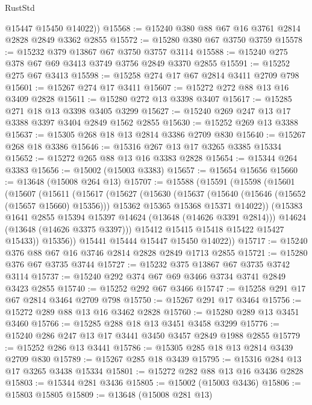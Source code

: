 \begin{lexlean}{RustStd}
\begin{coremodule}
        @15447
        @15450
        @14022))
@15568 := @15240 @380 @88 @67 @16 @3761 @2814 @2828 @2849 @3362 @2855
@15572 := @15280 @380 @67 @3750 @3759
@15578 := @15232 @379 @13867 @67 @3750 @3757 @3114
@15588 := @15240 @275 @378 @67 @69 @3413 @3749 @3756 @2849 @3370 @2855
@15591 := @15252 @275 @67 @3413
@15598 := @15258 @274 @17 @67 @2814 @3411 @2709 @798
@15601 := @15267 @274 @17 @3411
@15607 := @15272 @272 @88 @13 @16 @3409 @2828
@15611 := @15280 @272 @13 @3398 @3407
@15617 := @15285 @271 @18 @13 @3398 @3405 @3299
@15627 := @15240 @269 @247 @13 @17 @3388 @3397 @3404 @2849 @1562 @2855
@15630 := @15252 @269 @13 @3388
@15637 := @15305 @268 @18 @13 @2814 @3386 @2709 @830
@15640 := @15267 @268 @18 @3386
@15646 := @15316 @267 @13 @17 @3265 @3385 @15334
@15652 := @15272 @265 @88 @13 @16 @3383 @2828
@15654 := @15344 @264 @3383
@15656 := @15002 (@15003 @3383)
@15657 := @15654 @15656
@15660 := @13648 (@15008 @264 @13)
@15707 := @15588
    (@15591
      (@15598
        (@15601
          (@15607
            (@15611
              (@15617
                (@15627
                  (@15630
                    (@15637
                      (@15640 (@15646 (@15652 (@15657 @15660) @15356)))
                      @15362
                      @15365
                      @15368
                      @15371
                      @14022))
                  (@15383 @1641 @2855 @15394 @15397 @14624 (@13648 (@14626 @3391 @2814)))
                  @14624
                  (@13648 (@14626 @3375 @3397)))
                @15412
                @15415
                @15418
                @15422
                @15427
                @15433))
            @15356))
        @15441
        @15444
        @15447
        @15450
        @14022))
@15717 := @15240 @376 @88 @67 @16 @3746 @2814 @2828 @2849 @1713 @2855
@15721 := @15280 @376 @67 @3735 @3744
@15727 := @15232 @375 @13867 @67 @3735 @3742 @3114
@15737 := @15240 @292 @374 @67 @69 @3466 @3734 @3741 @2849 @3423 @2855
@15740 := @15252 @292 @67 @3466
@15747 := @15258 @291 @17 @67 @2814 @3464 @2709 @798
@15750 := @15267 @291 @17 @3464
@15756 := @15272 @289 @88 @13 @16 @3462 @2828
@15760 := @15280 @289 @13 @3451 @3460
@15766 := @15285 @288 @18 @13 @3451 @3458 @3299
@15776 := @15240 @286 @247 @13 @17 @3441 @3450 @3457 @2849 @1988 @2855
@15779 := @15252 @286 @13 @3441
@15786 := @15305 @285 @18 @13 @2814 @3439 @2709 @830
@15789 := @15267 @285 @18 @3439
@15795 := @15316 @284 @13 @17 @3265 @3438 @15334
@15801 := @15272 @282 @88 @13 @16 @3436 @2828
@15803 := @15344 @281 @3436
@15805 := @15002 (@15003 @3436)
@15806 := @15803 @15805
@15809 := @13648 (@15008 @281 @13)

\end{coremodule}
\end{lexlean}
